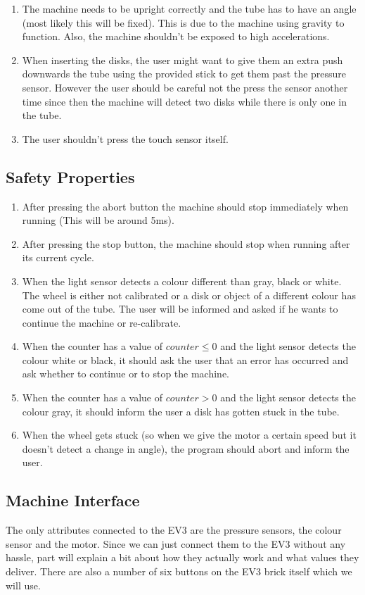 \begin{enumerate}
    \item The machine needs to be upright correctly and the tube has to have an angle (most likely this will be fixed). This is due to the machine using gravity to function. Also, the machine shouldn't be exposed to high accelerations.
    \item When inserting the disks, the user might want to give them an extra push downwards the tube using the provided stick to get them past the pressure sensor. However the user should be careful not the press the sensor another time since then the machine will detect two disks while there is only one in the tube. 
    \item The user shouldn't press the touch sensor itself.
\end{enumerate}

\subsection{Safety Properties} \label{SLR:safety-properties}
\begin{enumerate}
  \item After pressing the abort button the machine should stop immediately when running (This will be around 5ms).
  \item After pressing the stop button, the machine should stop when running after its current cycle.
  \item When the light sensor detects a colour different than gray, black or white. The wheel is either not calibrated or a disk or object of a different colour has come out of the tube. The user will be informed and asked if he wants to continue the machine or re-calibrate.
  \item When the counter has a value of $counter\leq0$ and the light sensor detects the colour white or black, it should ask the user that an error has occurred and ask whether to continue or to stop the machine.
  \item When the counter has a value of $counter>0$ and the light sensor detects the colour gray, it should inform the user a disk has gotten stuck in the tube.
  \item When the wheel gets stuck (so when we give the motor a certain speed but it doesn't detect a change in angle), the program should abort and inform the user.
\end{enumerate}

\subsection{Machine Interface}
The only attributes connected to the EV3 are the pressure sensors, the colour sensor and the motor. Since we can just connect them to the EV3 without any hassle, part will explain a bit about how they actually work and what values they deliver. There are also a number of six buttons on the EV3 brick itself which we will use.

